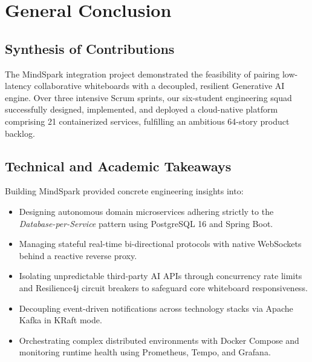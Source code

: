 
\chapter*{General Conclusion}


\section*{Synthesis of Contributions}
The MindSpark integration project demonstrated the feasibility of pairing low-latency collaborative whiteboards with a decoupled, resilient Generative AI engine. Over three intensive Scrum sprints, our six-student engineering squad successfully designed, implemented, and deployed a cloud-native platform comprising 21 containerized services, fulfilling an ambitious 64-story product backlog.

\section*{Technical and Academic Takeaways}
Building MindSpark provided concrete engineering insights into:
\begin{itemize}[leftmargin=1.5em, topsep=2pt, itemsep=1.5pt, parsep=0pt]
    \item Designing autonomous domain microservices adhering strictly to the \textit{Database-per-Service} pattern using PostgreSQL 16 and Spring Boot.
    \item Managing stateful real-time bi-directional protocols with native WebSockets behind a reactive reverse proxy.
    \item Isolating unpredictable third-party AI APIs through concurrency rate limits and Resilience4j circuit breakers to safeguard core whiteboard responsiveness.
    \item Decoupling event-driven notifications across technology stacks via Apache Kafka in KRaft mode.
    \item Orchestrating complex distributed environments with Docker Compose and monitoring runtime health using Prometheus, Tempo, and Grafana.
\end{itemize}

